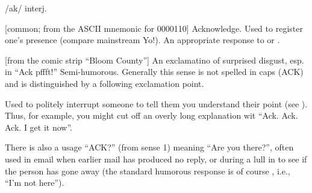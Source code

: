  /ak/ interj.

\begin{inparaenum}
	\item {[}common; from the ASCII mnemonic for 0000110] Acknowledge. Used to register one's presence (compare mainstream Yo!). An
		appropriate response to  or .
	\item {[}from the comic strip ``Bloom County''] An exclamatino of surprised disgust, esp. in ``Ack pffft!'' Semi-humorous. Generally
		this sense is not spelled in caps (ACK) and is distinguished by a following exclamation point.
	\item Used to politely interrupt someone to tell them you understand their point (see ). Thus, for example, you might cut
		off an overly long explanation wit ``Ack. Ack. Ack. I get it now''.
\end{inparaenum}

There is also a usage ``ACK?'' (from sense 1) meaning ``Are you there?'', often used in email when earlier mail has produced no reply, or
during a lull in  to see if the person has gone away (the standard humorous response is of course ,
i.e., ``I'm not here'').

